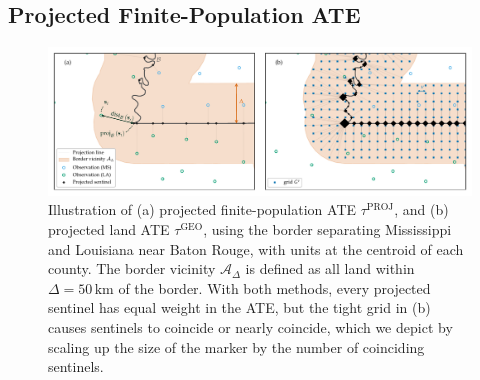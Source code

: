\documentclass[letter]{article}
\makeatletter
\def\maxwidth{\ifdim\Gin@nat@width>\linewidth\linewidth
\else\Gin@nat@width\fi}
\let\Oldincludegraphics\includegraphics
\renewcommand{\includegraphics}[1]{\Oldincludegraphics[width=0.9\maxwidth]{#1}}
\newcommand{\area}{\mathcal{A}}
\newcommand{\tauproj}{\tau^{\mathrm{PROJ}}}
\newcommand{\taugeo}{\tau^{\mathrm{GEO}}}
\newcommand{\buffer}{\Delta}
\makeatother
\begin{document}
    	\hypertarget{projected-finite-population-ate}{%
\subsection{Projected Finite-Population ATE}\label{projected-finite-population-ate}}
    


    	\begin{figure}
\centering
\includegraphics{../figures/mississippi_projection_methods.pdf}
\caption{\label{fig:mississippi_projection_methods}
Illustration of (a) projected finite-population ATE \(\tauproj\), and (b) projected land ATE \(\taugeo\), using the border separating Mississippi and Louisiana near Baton Rouge, with units at the centroid of each county.
The border vicinity \(\area_\buffer\) is defined as all land within \(\buffer=50\,\mathrm{km}\) of the border.
With both methods, every projected sentinel has equal weight in the ATE, but the tight grid in (b) causes sentinels to coincide or nearly coincide, which we depict by scaling up the size of the marker by the number of coinciding sentinels.}
\end{figure}
    
\end{document}
